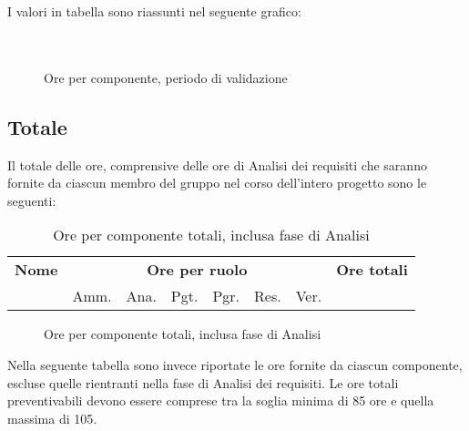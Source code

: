 I valori in tabella sono riassunti nel seguente grafico: \\ \\ \\
\begin{figure}[H]
\caption{Ore per componente, periodo di validazione}
\end{figure}

\pagebreak
\subsection{Totale}

Il totale delle ore, comprensive delle ore di Analisi dei requisiti che saranno fornite da ciascun membro del gruppo nel corso dell'intero progetto sono le seguenti:

\begin{table}[H]
\centering
\begin{tabular}{lccccccc}
\toprule 
    \textbf{Nome}  & \multicolumn{6}{c}{\textbf{Ore per ruolo}} & \textbf{Ore totali}\\
     & Amm. & Ana. & Pgt. & Pgr. & Res. & Ver. \\
    \midrule

		 	

    \bottomrule
\end{tabular}
\caption{Ore per componente totali, inclusa fase di Analisi}
\end{table}


\begin{figure}[H]
\caption{Ore per componente totali, inclusa fase di Analisi}
\end{figure}

Nella seguente tabella sono invece riportate le ore fornite da ciascun componente, escluse quelle rientranti nella fase di Analisi dei requisiti. 
Le ore totali preventivabili devono essere comprese tra la soglia minima di 85 ore e quella massima di 105.

